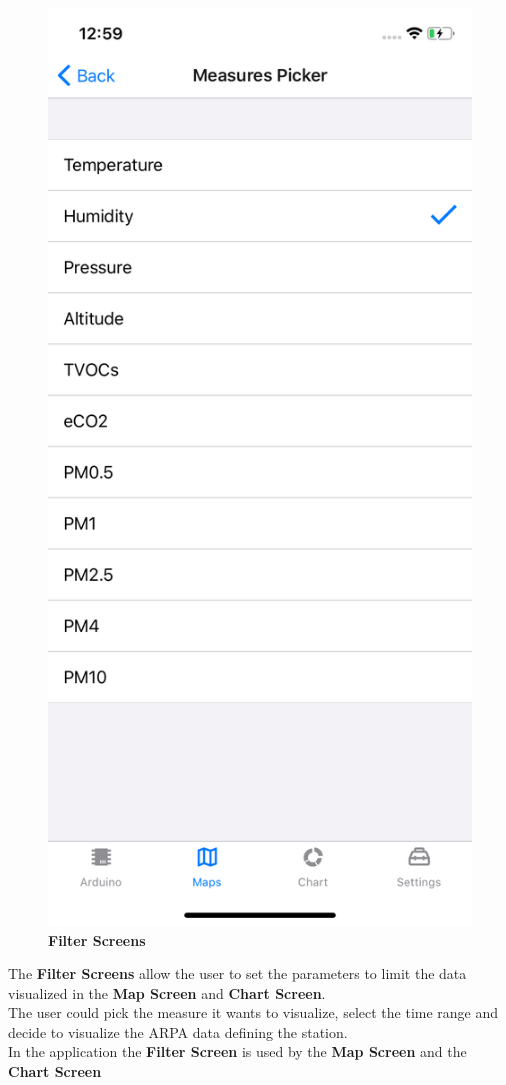 \begin{figure}[H]
\includegraphics[height=.6\textheight]{./img/ui/mea_picker.png}
\caption{\textbf{Filter Screens}}
\end{figure}
\begin{center}
The \textbf{Filter Screens} allow the user to set the parameters to limit the data visualized in the \textbf{Map Screen} and \textbf{Chart Screen}.\\
The user could pick the measure it wants to visualize, select the time range and decide to visualize the ARPA data defining the station.\\
In the application the \textbf{Filter Screen} is used by the \textbf{Map Screen} and the \textbf{Chart Screen}
\end{center}

